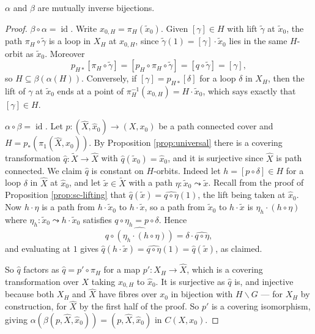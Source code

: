 \documentclass[a4paper]{scrartcl}
\newcommand{\id}{\operatorname{id}}
\begin{document}
\begin{theorem} \label{at-thm:galois}
	$\alpha$ and $\beta$ are mutually inverse bijections.
\end{theorem}
\begin{proof}
	\emph{$\beta \circ \alpha = \id$.} Write $x_{0,H} = \pi_H(\tilde x_0)$. Given $[\gamma] \in H$ with lift $\tilde\gamma$ at $\tilde x_0$, the path $\pi_H \circ \tilde\gamma$ is a loop in $X_H$ at $x_{0,H}$, since $\tilde\gamma(1) = [\gamma]\cdot\tilde x_0$ lies in the same $H$-orbit as $\tilde x_0$. Moreover
	$$
	p_{H*}[\pi_H \circ \tilde\gamma] = [p_H \circ \pi_H \circ \tilde\gamma] = [q \circ \tilde\gamma] = [\gamma],
	$$
	so $H \subseteq \beta(\alpha(H))$. Conversely, if $[\gamma] = p_{H*}[\delta]$ for a loop $\delta$ in $X_H$, then the lift of $\gamma$ at $\tilde x_0$ ends at a point of $\pi_H^{-1}(x_{0,H}) = H\cdot\tilde x_0$, which says exactly that $[\gamma] \in H$.

	\emph{$\alpha \circ \beta = \id$.} Let $p: (\hat X, \hat x_0) \to (X, x_0)$ be a path connected cover and $H = p_*(\pi_1(\hat X, \hat x_0))$. By Proposition \ref{prop:universal} there is a covering transformation $\hat q: \widetilde X \to \hat X$ with $\hat q(\tilde x_0) = \hat x_0$, and it is surjective since $\hat X$ is path connected. We claim $\hat q$ is constant on $H$-orbits. Indeed let $h = [p\circ\delta] \in H$ for a loop $\delta$ in $\hat X$ at $\hat x_0$, and let $\tilde x \in \widetilde X$ with a path $\eta: \tilde x_0 \leadsto \tilde x$. Recall from the proof of Proposition \ref{prop:sc-lifting} that $\hat q(\tilde x) = \widehat{q\circ\eta}(1)$, the lift being taken at $\hat x_0$. Now $h \cdot \eta$ is a path from $h\cdot\tilde x_0$ to $h \cdot \tilde x$, so a path from $\tilde x_0$ to $h\cdot\tilde x$ is $\eta_h \cdot (h\circ\eta)$ where $\eta_h: \tilde x_0 \leadsto h \cdot \tilde x_0$ satisfies $q \circ \eta_h = p \circ \delta$. Hence
	$$
	\widehat{q \circ (\eta_h \cdot (h\circ \eta))} = \delta \cdot \widehat{q \circ \eta},
	$$
	and evaluating at $1$ gives $\hat q(h\cdot\tilde x) = \widehat{q\circ\eta}(1) = \hat q(\tilde x)$, as claimed.

	So $\hat q$ factors as $\hat q = p' \circ \pi_H$ for a map $p': X_H \to \hat X$, which is a covering transformation over $X$ taking $x_{0,H}$ to $\hat x_0$. It is surjective as $\hat q$ is, and injective because both $X_H$ and $\hat X$ have fibres over $x_0$ in bijection with $H\backslash G$ --- for $X_H$ by construction, for $\hat X$ by the first half of the proof. So $p'$ is a covering isomorphism, giving $\alpha(\beta(p,\hat X, \hat x_0)) = (p, \hat X, \hat x_0)$ in $C(X, x_0)$.
\end{proof}
\end{document}
